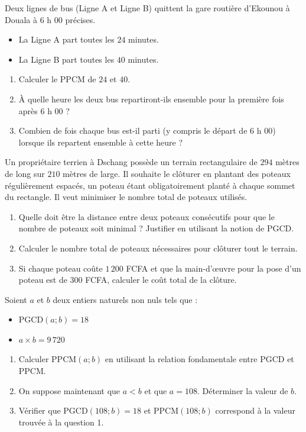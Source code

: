 \documentclass[11pt]{article}
\newcounter{popsec}
\newcounter{popsub}
\newcommand{\courssub}[1]{%
  \stepcounter{popsub}%
  \par\vspace{9pt}\noindent{\popxbold\fontsize{11.5}{13}\selectfont\color{popink}{\color{poporange}\thepopsec.\thepopsub}\hspace{6pt}#1}\par\nopagebreak\vspace{4pt}
}
\begin{document}
\begin{exercice}
Deux lignes de bus (Ligne A et Ligne B) quittent la gare routière d'Ekounou à Douala à $6$ h $00$ précises.
\begin{itemize}
    \item La Ligne A part toutes les $24$ minutes.
    \item La Ligne B part toutes les $40$ minutes.
\end{itemize}
\begin{enumerate}
    \item Calculer le PPCM de $24$ et $40$.
    \item À quelle heure les deux bus repartiront-ils ensemble pour la première fois après $6$ h $00$ ?
    \item Combien de fois chaque bus est-il parti (y compris le départ de $6$ h $00$) lorsque ils repartent ensemble à cette heure ?
\end{enumerate}
\end{exercice}

\courssub{Je me prépare au Probatoire}

\begin{exercice}
Un propriétaire terrien à Dschang possède un terrain rectangulaire de $294$ mètres de long sur $210$ mètres de large. Il souhaite le clôturer en plantant des poteaux régulièrement espacés, un poteau étant obligatoirement planté à chaque sommet du rectangle. Il veut minimiser le nombre total de poteaux utilisés.
\begin{enumerate}
    \item Quelle doit être la distance entre deux poteaux consécutifs pour que le nombre de poteaux soit minimal ? Justifier en utilisant la notion de PGCD.
    \item Calculer le nombre total de poteaux nécessaires pour clôturer tout le terrain.
    \item Si chaque poteau coûte $1\,200$ FCFA et que la main-d'œuvre pour la pose d'un poteau est de $300$ FCFA, calculer le coût total de la clôture.
\end{enumerate}
\end{exercice}

\begin{exercice}
Soient $a$ et $b$ deux entiers naturels non nuls tels que :
\begin{itemize}
    \item $\text{PGCD}(a ; b) = 18$
    \item $a \times b = 9\,720$
\end{itemize}
\begin{enumerate}
    \item Calculer $\text{PPCM}(a ; b)$ en utilisant la relation fondamentale entre PGCD et PPCM.
    \item On suppose maintenant que $a < b$ et que $a = 108$. Déterminer la valeur de $b$.
    \item Vérifier que $\text{PGCD}(108 ; b) = 18$ et $\text{PPCM}(108 ; b)$ correspond à la valeur trouvée à la question 1.
\end{enumerate}
\end{exercice}
\end{document}
